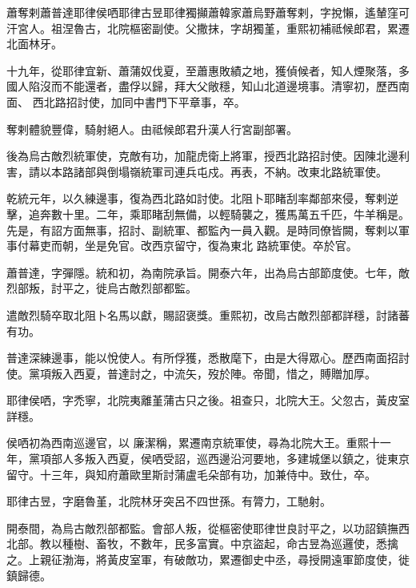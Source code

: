 
\begin{pinyinscope}

 蕭奪剌蕭普達耶律侯哂耶律古昱耶律獨攧蕭韓家蕭烏野蕭奪剌，字挩懶，遙輦窪可汗宮人。祖涅魯古，北院樞密副使。父撒抹，字胡獨堇，重熙初補祗候郎君，累遷北面林牙。



 十九年，從耶律宜新、蕭蒲奴伐夏，至蕭惠敗績之地，獲偵候者，知人煙聚落，多國人陷沒而不能還者，盡俘以歸，拜大父敞穩，知山北道邊境事。清寧初，歷西南面、
 西北路招討使，加同中書門下平章事，卒。



 奪剌體貌豐偉，騎射絕人。由祗候郎君升漢人行宮副部署。



 後為烏古敵烈統軍使，克敵有功，加龍虎衛上將軍，授西北路招討使。因陳北邊利害，請以本路諸部與倒塌嶺統軍司連兵屯戍。再表，不納。改東北路統軍使。



 乾統元年，以久練邊事，復為西北路如討使。北阻卜耶睹刮率鄰部來侵，奪剌逆擊，追奔數十里。二年，乘耶睹刮無備，以輕騎襲之，獲馬萬五千匹，牛羊稱是。先是，有詔方面無事，招討、副統軍、都監內一員入觀。是時同僚皆闕，奪剌以軍事付幕吏而朝，坐是免官。改西京留守，復為東北
 路統軍使。卒於官。



 蕭普達，字彈隱。統和初，為南院承旨。開泰六年，出為烏古部節度使。七年，敵烈部叛，討平之，徙烏古敵烈部都監。



 遣敵烈騎卒取北阻卜名馬以獻，賜詔褒獎。重熙初，改烏古敵烈部都詳穩，討諸蕃有功。



 普達深練邊事，能以悅使人。有所俘獲，悉散麾下，由是大得眾心。歷西南面招討使。黨項叛入西夏，普達討之，中流矢，歿於陣。帝聞，惜之，賻贈加厚。



 耶律侯哂，字禿寧，北院夷離堇蒲古只之後。祖查只，北院大王。父忽古，黃皮室詳穩。



 侯哂初為西南巡邊官，以
 廉潔稱，累遷南京統軍使，尋為北院大王。重熙十一年，黨項部人多叛入西夏，侯哂受詔，巡西邊沿河要地，多建城堡以鎮之，徙東京留守。十三年，與知府蕭歐里斯討蒲盧毛朵部有功，加兼侍中。致仕，卒。



 耶律古昱，字磨魯堇，北院林牙突呂不四世孫。有膂力，工馳射。



 開泰間，為烏古敵烈部都監。會部人叛，從樞密使耶律世良討平之，以功詔鎮撫西北部。教以種樹、畜牧，不數年，民多富實。中京盜起，命古昱為巡邏使，悉擒之。上親征渤海，將黃皮室軍，有破敵功，累遷御史中丞，尋授開遠軍節度使，徙鎮歸德。




\end{pinyinscope}
